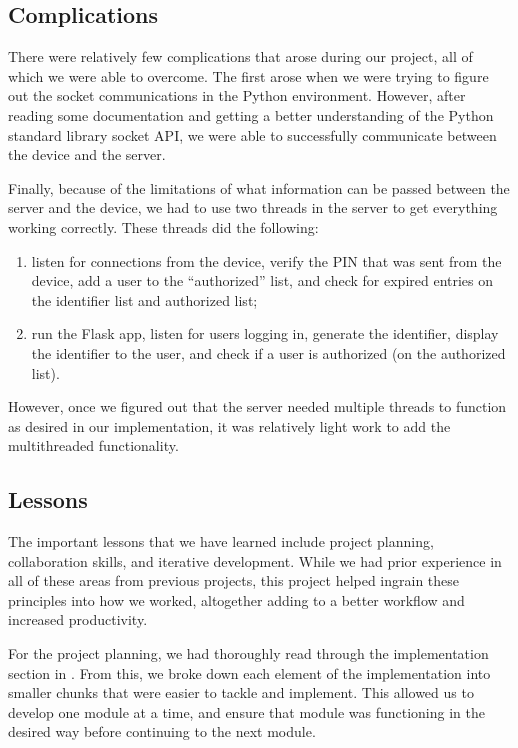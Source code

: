 \documentclass[11pt]{article} %
\begin{document}
\subsection{Complications}

There were relatively few complications that arose during our project,
all of which we were able to overcome. The first arose when we were
trying to figure out the socket communications in the Python
environment. However, after reading some documentation and getting a
better understanding of the Python standard library socket API, we were
able to successfully communicate between the device and the server. 

Finally, because of the limitations of what information can be passed
between the server and the device, we had to use two threads in the
server to get everything working correctly. These threads did the
following: 
\begin{enumerate}
    \item listen for connections from the device, verify the PIN that
    was sent from the device, add a user to the ``authorized'' list, and
    check for expired entries on the identifier list and authorized
    list;
    \item run the Flask app, listen for users logging in, generate the
    identifier, display the identifier to the user, and check if a user
    is authorized (on the authorized list). 
\end{enumerate}
However, once we figured out that the server needed multiple threads to
function as desired in our implementation, it was relatively light work
to add the multithreaded functionality. 

\subsection{Lessons}

The important lessons that we have learned include project planning,
collaboration skills, and iterative development. While we had prior
experience in all of these areas from previous projects, this project
helped ingrain these principles into how we worked, altogether adding to
a better workflow and increased productivity. 

For the project planning, we had thoroughly read through the
implementation section in \cite{shirvanian2d2fa}. From this, we 
broke down each element of the implementation into smaller chunks that
were easier to tackle and implement. This allowed us to develop one
module at a time, and ensure that module was functioning in the desired
way before continuing to the next module. 
\end{document}
